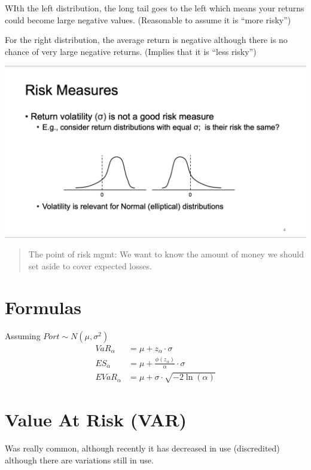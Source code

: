 \documentclass[
  oneside]{book}
\begin{document}
WIth the left distribution, the long tail goes to the left which means your returns could become large negative values. (Reasonable to assume it is ``more risky'')

For the right distribution, the average return is negative although there is no chance of very large negative returns. (Implies that it is ``less risky'')

\includegraphics{Notes/Obsidian-Attachments/7-Risk-Management.png}

\begin{quote}
The point of risk mgmt: We want to know the amount of money we should set aside to cover expected losses.
\end{quote}

\hypertarget{formulas}{%
\section{Formulas}\label{formulas}}

Assuming \(Port \sim N(\mu, \sigma^{2})\)
\[
\begin{aligned}
VaR_{\alpha} &= \mu +z_{\alpha}\cdot \sigma\\
ES_{\alpha} &= \mu + \frac{\phi(z_{\alpha})}{\alpha} \cdot \sigma\\
EVaR_{\alpha} &= \mu + \sigma \cdot \sqrt{-2\ln(\alpha)}
\end{aligned}
\]

\hypertarget{value-at-risk-var}{%
\section{Value At Risk (VAR)}\label{value-at-risk-var}}

Was really common, although recently it has decreased in use (discredited) although there are variations still in use.
\end{document}
